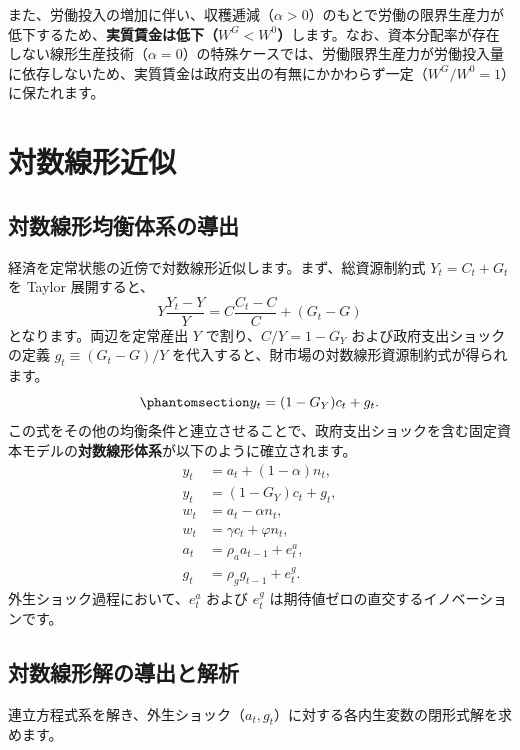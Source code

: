 \documentclass[
  japanese,
  lualatex,
  ja=standard,
  12pt,
  a4paper]{ltjsarticle}
\begin{document}
また、労働投入の増加に伴い、収穫逓減（\(\alpha > 0\)）のもとで労働の限界生産力が低下するため、\textbf{実質賃金は低下（\(W^G < W^0\)）}します。なお、資本分配率が存在しない線形生産技術（\(\alpha = 0\)）の特殊ケースでは、労働限界生産力が労働投入量に依存しないため、実質賃金は政府支出の有無にかかわらず一定（\(W^G/W^0 = 1\)）に保たれます。

\section{対数線形近似}\label{ux5bfeux6570ux7ddaux5f62ux8fd1ux4f3c}

\subsection{対数線形均衡体系の導出}\label{ux5bfeux6570ux7ddaux5f62ux5747ux8861ux4f53ux7cfbux306eux5c0eux51fa}

経済を定常状態の近傍で対数線形近似します。まず、総資源制約式
\(Y_t = C_t + G_t\) を Taylor 展開すると、 \[
Y \frac{Y_t - Y}{Y} = C \frac{C_t - C}{C} + (G_t - G)
\] となります。両辺を定常産出 \(Y\) で割り、\(C/Y = 1 - G_Y\)
および政府支出ショックの定義 \(g_t \equiv (G_t - G)/Y\)
を代入すると、財市場の対数線形資源制約式が得られます。
\begin{equation}\protect\phantomsection\label{eq-loglinear-resource-government}{
y_t = (1-G_Y) c_t + g_t.
}\end{equation}
この式をその他の均衡条件と連立させることで、政府支出ショックを含む固定資本モデルの\textbf{対数線形体系}が以下のように確立されます。
\[
\begin{aligned}
y_t &= a_t + (1-\alpha) n_t,\\
y_t &= (1-G_Y) c_t + g_t,\\
w_t &= a_t - \alpha n_t,\\
w_t &= \gamma c_t + \varphi n_t,\\
a_t &= \rho_a a_{t-1} + e_t^a,\\
g_t &= \rho_g g_{t-1} + e_t^g.
\end{aligned}
\] 外生ショック過程において、\(e_t^a\) および \(e_t^g\)
は期待値ゼロの直交するイノベーションです。

\subsection{対数線形解の導出と解析}\label{ux5bfeux6570ux7ddaux5f62ux89e3ux306eux5c0eux51faux3068ux89e3ux6790}

連立方程式系を解き、外生ショック（\(a_t, g_t\)）に対する各内生変数の閉形式解を求めます。
\end{document}
